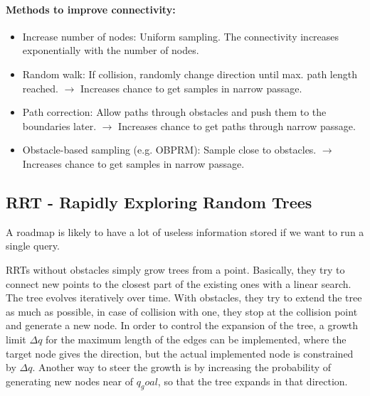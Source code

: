 \begin{multicols*}{2}
\paragraph{Methods to improve connectivity:}
\begin{itemize}
	\item Increase number of nodes: Uniform sampling. The connectivity increases exponentially with the number of nodes.
	\item Random walk: If collision, randomly change direction until max. path length reached. $\rightarrow$ Increases chance to get samples in narrow passage.
	\item Path correction: Allow paths through obstacles and push them to the boundaries later. $\rightarrow$ Increases chance to get paths through narrow passage.
	\item Obstacle-based sampling (e.g. OBPRM): Sample close to obstacles. $\rightarrow$ Increases chance to get samples in narrow passage.
\end{itemize}

\subsection{RRT - Rapidly Exploring Random Trees}
A roadmap is likely to have a lot of useless information stored if we want to run a single query.

RRTs without obstacles simply grow trees from a point.
Basically, they try to connect new points to the closest part of the existing ones with a linear search.
The tree evolves iteratively over time.
With obstacles, they try to extend the tree as much as possible, in case of collision with one, they stop at the collision point and generate a new node.
In order to control the expansion of the tree, a growth limit $\Delta q$ for the maximum length of the edges can be implemented, where the target node gives the direction, but the actual implemented node is constrained by $\Delta q$.
Another way to steer the growth is by increasing the probability of generating new nodes near of $q_goal$, so that the tree expands in that direction.


\end{multicols*}
